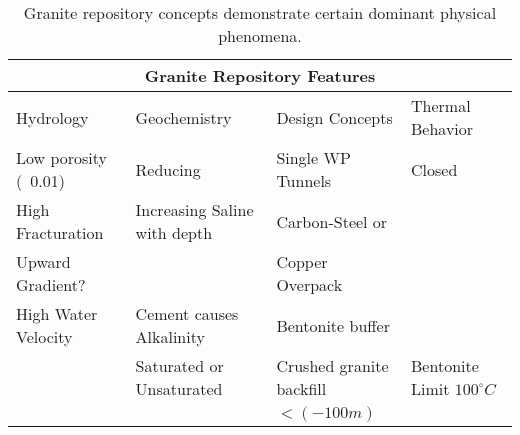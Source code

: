 %
\begin{table}[h!]
  \centering
  \footnotesize{
  \begin{tabular}{|l|l|l|l|}
    \multicolumn{4}{c}{\textbf{Granite Repository Features}}\\
    \hline
    Hydrology & Geochemistry & Design Concepts & Thermal Behavior \\ 
    \hline
    Low porosity (~0.01)&Reducing&Single WP Tunnels&Closed\\
    High Fracturation & Increasing Saline with depth\cite{von_lensa_red-impact_2008} \cite{von_lensa_red-impact_2008}& Carbon-Steel or &\\
    Upward Gradient? && Copper Overpack&\\
    High Water Velocity& Cement causes Alkalinity \cite{andra_granite:_2005}& Bentonite buffer &\\
    & Saturated or Unsaturated & Crushed granite backfill \cite{von_lensa_red-impact_2008}& Bentonite Limit $100^\circ C$\\
    &&$<(-100m)$&\\
    \hline
  \end{tabular}
  \caption[Granite Repository Features]{Granite repository 
  concepts demonstrate certain dominant physical phenomena.}
  \label{tab:granite_tab}
  }
\end{table}


